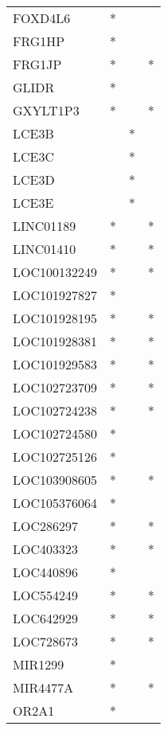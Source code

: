 \begin{longtable}{lccc}
FOXD4L6            &   * &     &         \\
FRG1HP             &   * &     &         \\
FRG1JP             &   * &     &       * \\
GLIDR              &   * &     &         \\
GXYLT1P3           &   * &     &       * \\
LCE3B              &     &   * &         \\
LCE3C              &     &   * &         \\
LCE3D              &     &   * &         \\
LCE3E              &     &   * &         \\
LINC01189          &   * &     &       * \\
LINC01410          &   * &     &       * \\
LOC100132249       &   * &     &       * \\
LOC101927827       &   * &     &         \\
LOC101928195       &   * &     &       * \\
LOC101928381       &   * &     &       * \\
LOC101929583       &   * &     &       * \\
LOC102723709       &   * &     &       * \\
LOC102724238       &   * &     &       * \\
LOC102724580       &   * &     &         \\
LOC102725126       &   * &     &         \\
LOC103908605       &   * &     &       * \\
LOC105376064       &   * &     &         \\
LOC286297          &   * &     &       * \\
LOC403323          &   * &     &       * \\
LOC440896          &   * &     &         \\
LOC554249          &   * &     &       * \\
LOC642929          &   * &     &       * \\
LOC728673          &   * &     &       * \\
MIR1299            &   * &     &         \\
MIR4477A           &   * &     &       * \\
OR2A1              &   * &     &         \\

\end{longtable}
